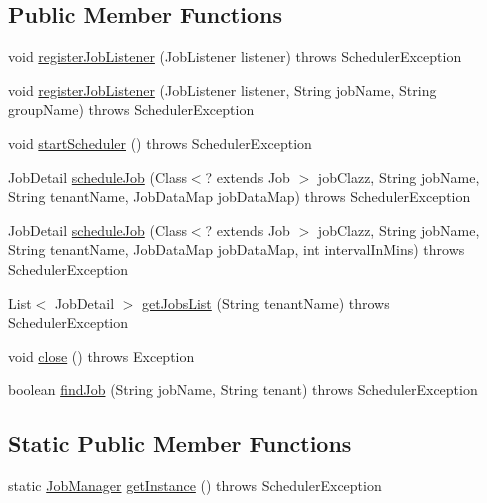 \subsection*{Public Member Functions}
\begin{DoxyCompactItemize}
\item 
void \hyperlink{classedu_1_1sjsu_1_1amigo_1_1cp_1_1jobs_1_1_job_manager_a5d286042b6dee04bf407a0ad0dfc90bf}{register\+Job\+Listener} (Job\+Listener listener)  throws Scheduler\+Exception 
\item 
void \hyperlink{classedu_1_1sjsu_1_1amigo_1_1cp_1_1jobs_1_1_job_manager_ac018c77a0a5bc6e8f08943348b982e2a}{register\+Job\+Listener} (Job\+Listener listener, String job\+Name, String group\+Name)  throws Scheduler\+Exception 
\item 
void \hyperlink{classedu_1_1sjsu_1_1amigo_1_1cp_1_1jobs_1_1_job_manager_ab864aafc50469b61907b86fd72a55b85}{start\+Scheduler} ()  throws Scheduler\+Exception 
\item 
Job\+Detail \hyperlink{classedu_1_1sjsu_1_1amigo_1_1cp_1_1jobs_1_1_job_manager_aebfbc60d4dd1b126a02fa4235b3a560c}{schedule\+Job} (Class$<$? extends Job $>$ job\+Clazz, String job\+Name, String tenant\+Name, Job\+Data\+Map job\+Data\+Map)  throws Scheduler\+Exception 
\item 
Job\+Detail \hyperlink{classedu_1_1sjsu_1_1amigo_1_1cp_1_1jobs_1_1_job_manager_a3fd1a027c447a1af88e3dcb4fde21085}{schedule\+Job} (Class$<$? extends Job $>$ job\+Clazz, String job\+Name, String tenant\+Name, Job\+Data\+Map job\+Data\+Map, int interval\+In\+Mins)  throws Scheduler\+Exception 
\item 
List$<$ Job\+Detail $>$ \hyperlink{classedu_1_1sjsu_1_1amigo_1_1cp_1_1jobs_1_1_job_manager_a08f7571e06cbd3f1ea8e866b5439511f}{get\+Jobs\+List} (String tenant\+Name)  throws Scheduler\+Exception 
\item 
void \hyperlink{classedu_1_1sjsu_1_1amigo_1_1cp_1_1jobs_1_1_job_manager_ac4c20f7bb76c26a3c97827283ef1213b}{close} ()  throws Exception 
\item 
boolean \hyperlink{classedu_1_1sjsu_1_1amigo_1_1cp_1_1jobs_1_1_job_manager_a9ed144bf27bd9eced89baa08d72d8911}{find\+Job} (String job\+Name, String tenant)  throws Scheduler\+Exception 
\end{DoxyCompactItemize}
\subsection*{Static Public Member Functions}
\begin{DoxyCompactItemize}
\item 
static \hyperlink{classedu_1_1sjsu_1_1amigo_1_1cp_1_1jobs_1_1_job_manager}{Job\+Manager} \hyperlink{classedu_1_1sjsu_1_1amigo_1_1cp_1_1jobs_1_1_job_manager_aaeb161ffe7a75922ee34e5a9ebe8260a}{get\+Instance} ()  throws Scheduler\+Exception 
\end{DoxyCompactItemize}


